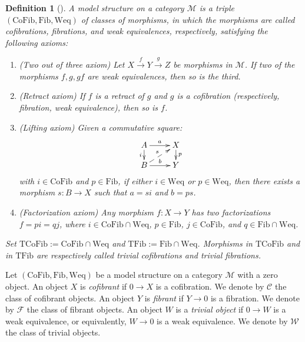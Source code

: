 \documentclass[11pt,a4paper]{amsart}
\numberwithin{equation}{section}
\theoremstyle{plain}
\newtheorem{definition}[thm]{Definition}
\begin{document}
\begin{definition}[{\cite{Quillen_1967}}]\label{def:model structure}
	A \emph{model structure} on a category $\mathscr{M}$ is a triple $(\mathrm{CoFib},\mathrm{Fib},\mathrm{Weq})$ of classes of morphisms, in which the morphisms are called \emph{cofibrations}, \emph{fibrations}, and \emph{weak equivalences}, respectively, satisfying the following axioms:
	\begin{enumerate}
		\item[(CM1)] (Two out of three axiom) Let $X\stackrel{f}{\longrightarrow} Y\stackrel{g}{\longrightarrow} Z$ be morphisms in $\mathscr{M}$. If two of the morphisms $f, g, gf$ are weak equivalences, then so is the third.
		
		\item[(CM2)] (Retract axiom) If $f$ is a retract of $g$ and $g$ is a cofibration (respectively, fibration, weak equivalence), then so is $f$.
		
		\item[(CM3)] (Lifting axiom) Given a commutative square:
		$$\xymatrix@R=0.4cm{
			A\ar[r]^-a \ar[d]_-i & X \ar[d]^-p \\
			B\ar[r]^-b \ar@{-->}[ru]^-s & Y 
		}$$
		with $i\in \mathrm{CoFib}$ and $p\in \mathrm{Fib}$, if either $i\in \mathrm{Weq}$ or $p\in\mathrm{Weq}$, then there exists a morphism $s: B\longrightarrow X$ such that $a=si$ and $b=ps$.
		
		\item[(CM4)] (Factorization axiom) Any morphism $f:X\longrightarrow Y$ has two factorizations $f=pi = qj$, where $i\in \mathrm{CoFib}\cap\mathrm{Weq}$, $p\in \mathrm{Fib}$, $j\in \mathrm{CoFib}$, and $q\in\mathrm{Fib}\cap\mathrm{Weq}$.
	\end{enumerate}
	Set $\mathrm{TCoFib}:=\mathrm{CoFib}\cap \mathrm{Weq}$ and $\mathrm{TFib}:=\mathrm{Fib}\cap \mathrm{Weq}$. Morphisms in $\mathrm{TCoFib}$ and in $\mathrm{TFib}$ are respectively called \emph{trivial cofibrations} and \emph{trivial fibrations}.
\end{definition}

Let $(\mathrm{CoFib}, \mathrm{Fib}, \mathrm{Weq})$ be a model structure on a category $\mathscr{M}$ with a zero object. An object $X$ is \emph{cofibrant} if $0 \longrightarrow X$ is a cofibration. We denote by $\mathcal{C}$ the class of cofibrant objects. An object $Y$ is \emph{fibrant} if $Y \longrightarrow 0$ is a fibration. We denote by $\mathcal{F}$ the class of fibrant objects. An object $W$ is a \emph{trivial object} if $0 \longrightarrow W$ is a weak equivalence, or equivalently, $W \longrightarrow 0$ is a weak equivalence. We denote by $\mathcal{W}$ the class of trivial objects.
\end{document}
